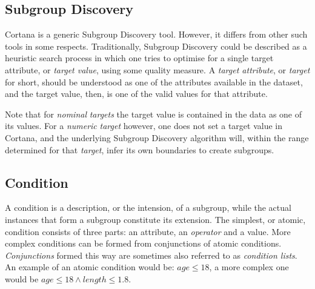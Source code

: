 \documentclass{article}
\begin{document}
\subsection{Subgroup Discovery}
\label{preliminaties:subgroup-discovery}
Cortana is a generic Subgroup Discovery tool.
However, it differs from other such tools in some respects.
Traditionally, Subgroup Discovery could be described as a heuristic search process in which one tries to optimise for a single target attribute, or \emph{target value}, using some quality measure.
A \emph{target attribute}, or \emph{target} for short, should be understood as one of the attributes available in the dataset, and the target value, then, is one of the valid values for that attribute.

Note that for \emph{nominal} \emph{targets} the target value is contained in the data as one of its values.
For a \emph{numeric} \emph{target} however, one does not set a target value in Cortana, and the underlying Subgroup Discovery algorithm will, within the range determined for that \emph{target}, infer its own boundaries to create subgroups.



\subsection{Condition}
\label{preliminaries:condition}
A condition is a description, or the intension, of a subgroup, while the actual instances that form a subgroup constitute its extension.
The simplest, or atomic, condition consists of three parts: an attribute, an \emph{operator} and a value.
More complex conditions can be formed from conjunctions of atomic conditions.
\emph{Conjunctions} formed this way are sometimes also referred to as \emph{condition lists}.
An example of an atomic condition would be: $age \leq 18$, a more complex one would be $age \leq 18 \wedge length \leq 1.8$.






\end{document}
